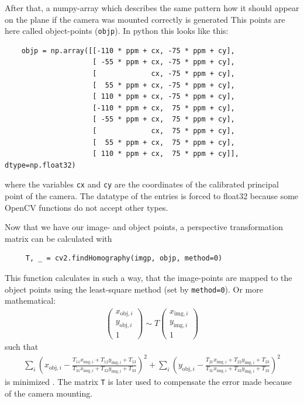 After that, a numpy-array which describes the same pattern how it should appear on the plane if the camera was mounted correctly is generated
This points are here called object-points (\texttt{objp}).
In python this looks like this:
\begin{lstlisting}
	objp = np.array([[-110 * ppm + cx, -75 * ppm + cy],
	                 [ -55 * ppm + cx, -75 * ppm + cy],
	                 [             cx, -75 * ppm + cy],
	                 [  55 * ppm + cx, -75 * ppm + cy],
	                 [ 110 * ppm + cx, -75 * ppm + cy],
	                 [-110 * ppm + cx,  75 * ppm + cy],
	                 [ -55 * ppm + cx,  75 * ppm + cy],
	                 [             cx,  75 * ppm + cy],
	                 [  55 * ppm + cx,  75 * ppm + cy],
	                 [ 110 * ppm + cx,  75 * ppm + cy]], dtype=np.float32)
\end{lstlisting}
where the variables \texttt{cx} and \texttt{cy} are the coordinates of the calibrated principal point of the camera.
The datatype of the entries is forced to float32 because some OpenCV functions do not accept other types.

Now that we have our image- and object points, a perspective transformation matrix can be calculated with
\begin{lstlisting}
	 T, _ = cv2.findHomography(imgp, objp, method=0)
\end{lstlisting}
This function calculates  in such a way, that the image-points are mapped to the object points using the least-square method (set by \texttt{method=0}).
Or more mathematical:
\begin{align*}
	\begin{pmatrix}
	x_{\text{obj}, i}\\
	y_{\text{obj}, i}\\
	1
	\end{pmatrix}\sim T
	\begin{pmatrix}
	x_{\text{img}, i}\\
	y_{\text{img}, i}\\
	1
	\end{pmatrix}	
\end{align*}
such that
\begin{align*}
	\sum_{i}\left(x_{\text{obj},i}-\frac{T_{11}x_{\text{img},i}+T_{12}y_{\text{img},i}+T_{13}}{T_{31}x_{\text{img},i}+T_{32}y_{\text{img},i}+T_{33}}\right)^2+
	\sum_{i}\left(y_{\text{obj},i}-\frac{T_{21}x_{\text{img},i}+T_{22}y_{\text{img},i}+T_{23}}{T_{31}x_{\text{img},i}+T_{32}y_{\text{img},i}+T_{33}}\right)^2
\end{align*}
is minimized \cite{cv_calib}.
The matrix \texttt{T} is later used to compensate the error made because of the camera mounting. 

